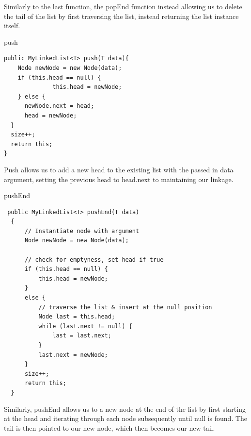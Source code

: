 \documentclass[a4paper]{article}
\begin{document}
Similarly to the last function, the popEnd function instead allowing
us to delete the tail of the list by first traversing the list,
instead returning the list instance itself.



\begin{algorithm}
\caption{push}\label{euclid}

\begin{verbatim}
public MyLinkedList<T> push(T data){
    Node newNode = new Node(data);
    if (this.head == null) {
              this.head = newNode;
    } else {
      newNode.next = head;
      head = newNode;
  }
  size++;
  return this;
}
\end{verbatim}

\end{algorithm}

Push allows us to add a new head to the existing list 
with the passed in data argument, setting the previous head 
to head.next to maintaining our linkage.

\newpage



\begin{algorithm}
\caption{pushEnd}\label{euclid}

\begin{verbatim}
 public MyLinkedList<T> pushEnd(T data)
  {
      // Instantiate node with argument
      Node newNode = new Node(data);
       
      // check for emptyness, set head if true
      if (this.head == null) {
          this.head = newNode;
      }
      else {
          // traverse the list & insert at the null position
          Node last = this.head;
          while (last.next != null) {
              last = last.next;
          }
          last.next = newNode;
      }
      size++;
      return this;
  }
\end{verbatim}

\end{algorithm}


Similarly, pushEnd allows us to a new node at the end of the list by first starting 
at the head and iterating through each node subsequently until null is found. 
The tail is then pointed to our new node, which then becomes our new tail.
\newpage

\end{document}
